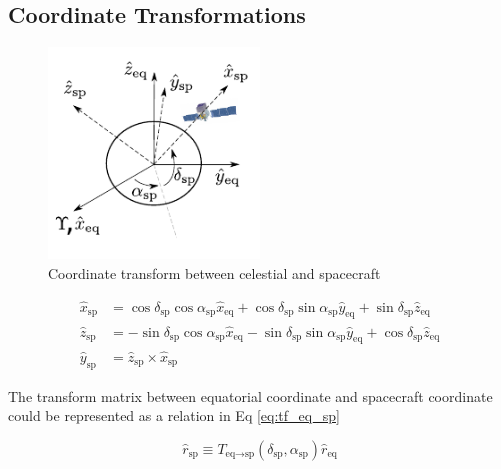 \subsection{Coordinate Transformations}


\begin{figure}[h!]
    \centering
    \includegraphics[width=0.5\textwidth]{img/fig_coordinate/coord_eq_sp.pdf}
    \caption{Coordinate transform between celestial and spacecraft}
\end{figure}

\begin{equation}
    \begin{split}
    \hat{x}_\text{sp} &= \cos\delta_\text{sp}\cos\alpha_\text{sp}\hat{x}_\text{eq} + \cos\delta_\text{sp}\sin\alpha_\text{sp}\hat{y}_\text{eq} + \sin\delta_\text{sp}\hat{z}_\text{eq}\\
    \hat{z}_\text{sp} &= - \sin\delta_\text{sp}\cos\alpha_\text{sp}\hat{x}_\text{eq} - \sin\delta_\text{sp}\sin\alpha_\text{sp}\hat{y}_\text{eq} + \cos\delta_\text{sp}\hat{z}_\text{eq} \\
    \hat{y}_\text{sp} &= \hat{z}_\text{sp} \times \hat{x}_\text{sp}
    \end{split}
    \label{eq:tf_eq_sp}
\end{equation}

The transform matrix between equatorial coordinate and spacecraft coordinate could be represented as a relation in Eq \ref{eq:tf_eq_sp}

\begin{equation}
    \hat{r}_\text{sp} \equiv T_{\text{eq}\rightarrow\text{sp}} (\delta_\text{sp}, \alpha_\text{sp}) \hat{r}_\text{eq}
\end{equation}

